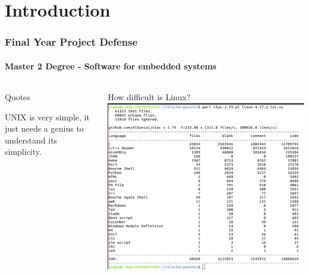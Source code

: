 \documentclass[11pt]{beamer}
\begin{document}
\section{Introduction}
    \begin{frame}
\frametitle{Final Year Project Defense}

\framesubtitle{Master 2 Degree - Software for embedded systems}



 
 
 
 
 
\begin{columns}[t]

\hspace{15px}
\begin{column}{3cm}

\begin{alertblock}{Quotes}

UNIX is very simple, it just needs a genius to understand its simplicity.



\end{alertblock}

\end{column}

\hspace{60px}
\begin{column}{10cm}
\hspace{10px} {\Large How difficult is Linux?}
\vspace{15px}
	\includegraphics[scale=0.20]{img/linux-number-lines-of-code.png}

\end{column}


\end{columns} 
 

    \end{frame}
\end{document}
